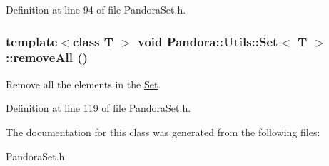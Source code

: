 Definition at line 94 of file PandoraSet.h.\hypertarget{classPandora_1_1Utils_1_1Set_aa134d362ed2baacc3ca0864cb6f10cb7}{
\subsubsection[{removeAll}]{\setlength{\rightskip}{0pt plus 5cm}template$<$class T $>$ void {\bf Pandora::Utils::Set}$<$ T $>$::removeAll ()}}
\label{classPandora_1_1Utils_1_1Set_aa134d362ed2baacc3ca0864cb6f10cb7}


Remove all the elements in the \hyperlink{classPandora_1_1Utils_1_1Set}{Set}. 

Definition at line 119 of file PandoraSet.h.

The documentation for this class was generated from the following files:\begin{DoxyCompactItemize}
\item 
PandoraSet.h\end{DoxyCompactItemize}
